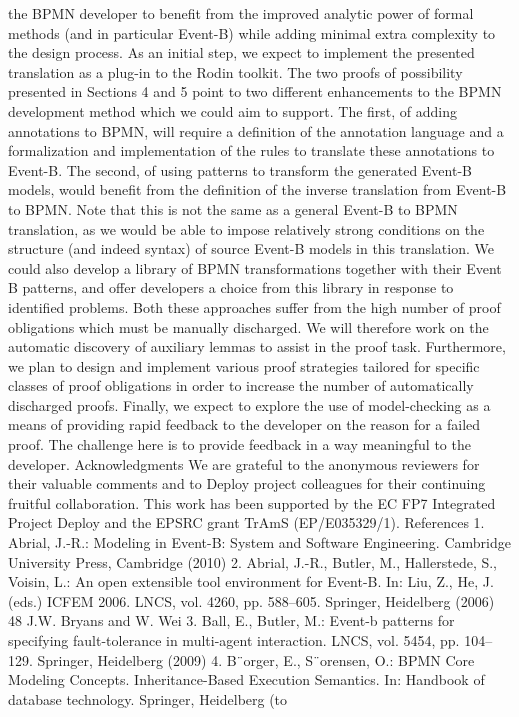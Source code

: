 the BPMN developer to benefit from the improved analytic power of formal
methods (and in particular Event-B) while adding minimal extra complexity to
the design process. As an initial step, we expect to implement the presented
translation as a plug-in to the Rodin toolkit.
The two proofs of possibility presented in Sections 4 and 5 point to two different enhancements to the BPMN development method which we could aim to
support. The first, of adding annotations to BPMN, will require a definition of
the annotation language and a formalization and implementation of the rules to
translate these annotations to Event-B. The second, of using patterns to transform the generated Event-B models, would benefit from the definition of the
inverse translation from Event-B to BPMN. Note that this is not the same as a
general Event-B to BPMN translation, as we would be able to impose relatively
strong conditions on the structure (and indeed syntax) of source Event-B models
in this translation. We could also develop a library of BPMN transformations
together with their Event B patterns, and offer developers a choice from this
library in response to identified problems.
Both these approaches suffer from the high number of proof obligations which
must be manually discharged. We will therefore work on the automatic discovery
of auxiliary lemmas to assist in the proof task. Furthermore, we plan to design
and implement various proof strategies tailored for specific classes of proof obligations in order to increase the number of automatically discharged proofs.
Finally, we expect to explore the use of model-checking as a means of providing
rapid feedback to the developer on the reason for a failed proof. The challenge
here is to provide feedback in a way meaningful to the developer.
Acknowledgments
We are grateful to the anonymous reviewers for their valuable comments and to
Deploy project colleagues for their continuing fruitful collaboration. This work
has been supported by the EC FP7 Integrated Project Deploy and the EPSRC
grant TrAmS (EP/E035329/1).
References
1. Abrial, J.-R.: Modeling in Event-B: System and Software Engineering. Cambridge
University Press, Cambridge (2010)
2. Abrial, J.-R., Butler, M., Hallerstede, S., Voisin, L.: An open extensible tool environment for Event-B. In: Liu, Z., He, J. (eds.) ICFEM 2006. LNCS, vol. 4260, pp.
588–605. Springer, Heidelberg (2006)
48 J.W. Bryans and W. Wei
3. Ball, E., Butler, M.: Event-b patterns for specifying fault-tolerance in multi-agent
interaction. LNCS, vol. 5454, pp. 104–129. Springer, Heidelberg (2009)
4. B¨orger, E., S¨orensen, O.: BPMN Core Modeling Concepts. Inheritance-Based Execution Semantics. In: Handbook of database technology. Springer, Heidelberg (to

